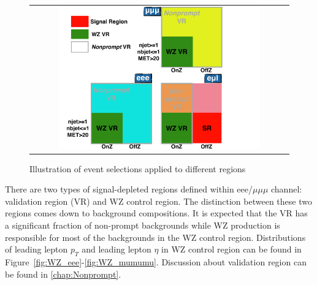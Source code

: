\begin{figure}[tbh!]
 \begin{center}
 \begin{tabular}{c}
 \includegraphics[width=0.8\textwidth]{figures/Part3/Selection/Event}
 \end{tabular}
 \caption{Illustration of event selections applied to different regions}
 \label{fig:Event}
 \end{center}
\end{figure}

There are two types of signal-depleted regions defined within eee/$\mu\mu\mu$ channel: validation region (VR) and WZ control region. The distinction between these two regions comes down to background compositions. It is expected that the VR has a significant fraction of non-prompt backgrounds while WZ production is responsible for most of the backgrounds in the WZ control region. Distributions of leading lepton $p_{T}$ and leading lepton $\eta$ in WZ control region can be found in Figure~\ref{fig:WZ_eee}-\ref{fig:WZ_mumumu}. Discussion about validation region can be found in \autoref{chap:Nonprompt}.

